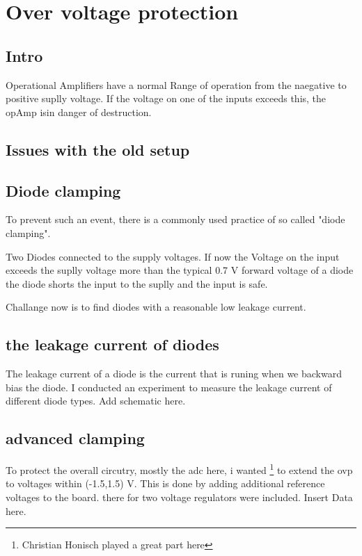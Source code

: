 
\chapter{Over voltage protection}
\label{sec:OVP}
\section{Intro}
Operational Amplifiers have a normal Range of operation from the naegative to positive suplly voltage. If the voltage on one of the inputs exceeds this, the opAmp isin danger of destruction.

\section{Issues with the old setup}

\section{Diode clamping}
To prevent such an event, there is a commonly used practice of so called "diode clamping".

Two Diodes connected to the supply voltages. If now the Voltage on the input exceeds the suplly voltage more than the typical 0.7 V forward voltage of a diode the diode shorts the input to the suplly and the input is safe.

Challange now is to find diodes with a reasonable low leakage current. 

\section{the leakage current of diodes}
The leakage current of a diode is the current that is runing when we backward bias the diode.
I conducted an experiment to measure the leakage current of different diode types.
Add schematic here. 


\section{advanced clamping}
To protect the overall circutry, mostly the adc here, i wanted \footnote{Christian Honisch played a great part here} to extend the ovp to voltages within (-1.5,1.5) V.
This is done by adding additional reference voltages to the board. there for two voltage regulators were included.
Insert Data here.
